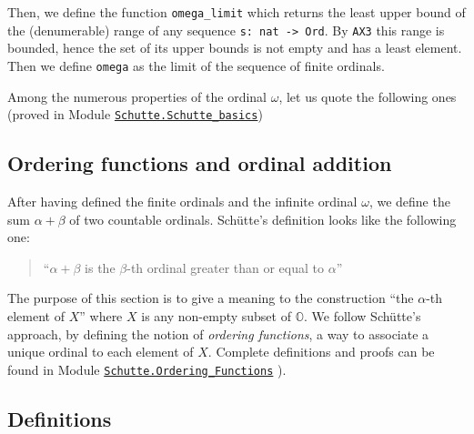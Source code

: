 {




Then, we define the function \texttt{omega\_limit} which returns the least upper bound 
of the  (denumerable) range of any sequence \texttt{s: nat -> Ord}. 
By \texttt{AX3} this range is bounded, hence the set of its upper bounds is not empty and has a least element.
Then we define \texttt{omega} as the limit of the sequence of finite ordinals.



\label{sect:notation-omega}




Among the numerous properties of the ordinal $\omega$, let us quote the following ones
(proved in Module 
\href{../theories/html/hydras.Schutte.Schutte_basics.html\#finite_lt_omega}{\texttt{Schutte.Schutte\_basics}})








\subsection{Ordering functions and ordinal addition}

After having defined the finite ordinals and the infinite ordinal $\omega$, we  define the sum $\alpha+\beta$ of two countable ordinals.
Schütte's definition looks like the following one:

\begin{quote}
``$\alpha+\beta$ is the $\beta$-th ordinal greater than or equal to $\alpha$''
\end{quote}


The purpose of this section is to give a meaning to the construction
``the $\alpha$-th element of $X$''  where $X$ is any non-empty subset of $\mathbb{O}$.
We follow Schütte's approach, by defining the notion of \emph{ordering functions},
a way to associate a unique ordinal to each element of $X$.
Complete definitions and proofs can be found in Module
 \href{../theories/html/hydras.Schutte.Ordering_Functions.html}%
{\texttt{Schutte.Ordering\_Functions}} ).

\subsection{Definitions}

}
